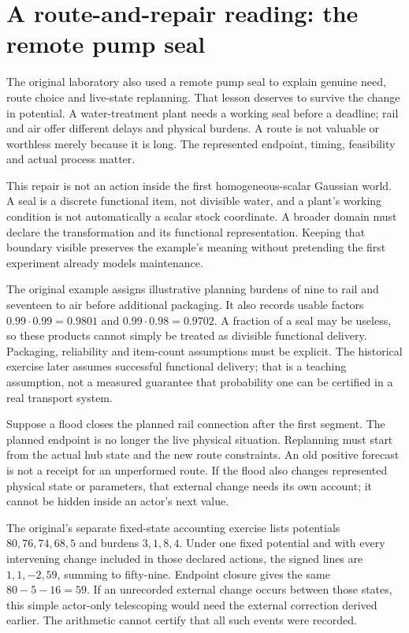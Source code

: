 \section{A route-and-repair reading: the remote pump seal}
The original laboratory also used a remote pump seal to explain genuine
need, route choice and live-state replanning. That lesson deserves to
survive the change in potential. A water-treatment plant needs a working
seal before a deadline; rail and air offer different delays and physical
burdens. A route is not valuable or worthless merely because it is long.
The represented endpoint, timing, feasibility and actual process matter.

This repair is not an action inside the first homogeneous-scalar Gaussian
world. A seal is a discrete functional item, not divisible water, and a
plant's working condition is not automatically a scalar stock coordinate.
A broader domain must declare the transformation and its functional
representation. Keeping that boundary visible preserves the example's
meaning without pretending the first experiment already models maintenance.

The original example assigns illustrative planning burdens of nine to
rail and seventeen to air before additional packaging. It also records
usable factors $0.99\cdot0.99=0.9801$ and
$0.99\cdot0.98=0.9702$. A fraction of a seal may be useless, so
these products cannot simply be treated as divisible functional delivery.
Packaging, reliability and item-count assumptions must be explicit.
The historical exercise later assumes successful functional delivery;
that is a teaching assumption, not a measured guarantee that probability
one can be certified in a real transport system.

Suppose a flood closes the planned rail connection after the first segment.
The planned endpoint is no longer the live physical situation. Replanning
must start from the actual hub state and the new route constraints.
An old positive forecast is not a receipt for an unperformed route. If
the flood also changes represented physical state or parameters, that
external change needs its own account; it cannot be hidden inside an
actor's next value.

The original's separate fixed-state accounting exercise lists potentials
$80,76,74,68,5$ and burdens $3,1,8,4$. Under one fixed potential
and with every intervening change included in those declared actions,
the signed lines are $1,1,-2,59$, summing to fifty-nine. Endpoint
closure gives the same $80-5-16=59$. If an unrecorded external change
occurs between those states, this simple actor-only telescoping would
need the external correction derived earlier. The arithmetic cannot
certify that all such events were recorded.

